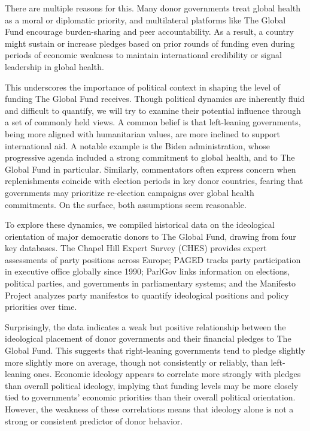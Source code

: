 \documentclass[
]{article}
\begin{document}
There are multiple reasons for this. Many donor governments treat global
health as a moral or diplomatic priority, and multilateral platforms
like The Global Fund encourage burden-sharing and peer accountability.
As a result, a country might sustain or increase pledges based on prior
rounds of funding even during periods of economic weakness to maintain
international credibility or signal leadership in global health.

This underscores the importance of political context in shaping the
level of funding The Global Fund receives. Though political dynamics are
inherently fluid and difficult to quantify, we will try to examine their
potential influence through a set of commonly held views. A common
belief is that left-leaning governments, being more aligned with
humanitarian values, are more inclined to support international aid. A
notable example is the Biden administration, whose progressive agenda
included a strong commitment to global health, and to The Global Fund in
particular. Similarly, commentators often express concern when
replenishments coincide with election periods in key donor countries,
fearing that governments may prioritize re-election campaigns over
global health commitments. On the surface, both assumptions seem
reasonable.

To explore these dynamics, we compiled historical data on the
ideological orientation of major democratic donors to The Global Fund,
drawing from four key databases. The Chapel Hill Expert Survey (CHES)
provides expert assessments of party positions across Europe; PAGED
tracks party participation in executive office globally since 1990;
ParlGov links information on elections, political parties, and
governments in parliamentary systems; and the Manifesto Project analyzes
party manifestos to quantify ideological positions and policy priorities
over time.

Surprisingly, the data indicates a weak but positive relationship
between the ideological placement of donor governments and their
financial pledges to The Global Fund. This suggests that right-leaning
governments tend to pledge slightly more slightly more on average,
though not consistently or reliably, than left-leaning ones. Economic
ideology appears to correlate more strongly with pledges than overall
political ideology, implying that funding levels may be more closely
tied to governments' economic priorities than their overall political
orientation. However, the weakness of these correlations means that
ideology alone is not a strong or consistent predictor of donor
behavior.
\end{document}
